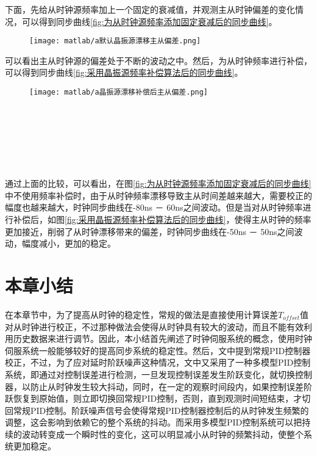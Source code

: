 下面，先给从时钟源频率加上一个固定的衰减值，并观测主从时钟偏差的变化情况，可以得到同步曲线\ref{fig:为从时钟源频率添加固定衰减后的同步曲线}。
\begin{figure}[!hbp]
  \centering
  \begin{minipage}[b]{1\textwidth}
    \captionstyle{\centering}
    \centering
    \texttt{[image: matlab/a默认晶振源漂移主从偏差.png]}
  \end{minipage}     
\end{figure}
可以看出主从时钟源的偏差处于不断的波动之中。然后，为从时钟频率进行补偿，可以得到同步曲线\ref{fig:采用晶振源频率补偿算法后的同步曲线}。
\begin{figure}[htbp]
  \centering
  \begin{minipage}[b]{1\textwidth}
    \captionstyle{\centering}
    \centering
    \texttt{[image: matlab/a晶振源漂移补偿后主从偏差.png]}
  \end{minipage}     
\end{figure}
\\ \\ \\ \\ \\ \\

通过上面的比较，可以看出，在图\ref{fig:为从时钟源频率添加固定衰减后的同步曲线}中不使用频率补偿时，由于从时钟频率漂移导致主从时间差越来越大，需要校正的幅度也越来越大，时钟同步曲线在-80ns － 60ns之间波动。但是当对从时钟频率进行补偿后，如图\ref{fig:采用晶振源频率补偿算法后的同步曲线}，使得主从时钟的频率更加接近，削弱了从时钟漂移带来的偏差，时钟同步曲线在-50ns － 50ns之间波动，幅度减小，更加的稳定。

\section{本章小结}
在本章节中，为了提高从时钟的稳定性，常规的做法是直接使用计算误差$T_{offset}$值对从时钟进行校正，不过那种做法会使得从时钟具有较大的波动，而且不能有效利用历史数据来进行调节。因此，本小结首先阐述了时钟伺服系统的概念，使用时钟伺服系统一般能够较好的提高同步系统的稳定性。然后，文中提到常规PID控制器校正，不过，为了应对延时阶跃噪声这种情况，文中又采用了一种多模型PID控制系统，即通过对控制误差进行检测，一旦发现控制误差发生阶跃变化，就切换控制器，以防止从时钟发生较大抖动，同时，在一定的观察时间段内，如果控制误差阶跃恢复到原始值，则立即切换回常规PID控制，否则，直到观测时间短结束，才切回常规PID控制。阶跃噪声信号会使得常规PID控制器控制后的从时钟发生频繁的调整，这会影响到依赖它的整个系统的抖动。而采用多模型PID控制系统可以把持续的波动转变成一个瞬时性的变化，这可以明显减小从时钟的频繁抖动，使整个系统更加稳定。

